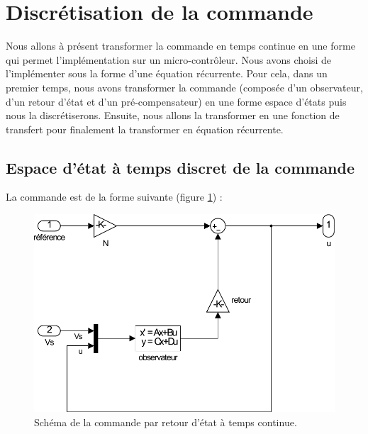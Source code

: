 	  	
	  	

\section{Discrétisation de la commande}
Nous allons à présent transformer la commande en temps continue en une forme qui permet l'implémentation sur un micro-contrôleur. Nous avons choisi de l'implémenter sous la forme d'une équation récurrente. Pour cela, dans un premier temps, nous avons transformer la commande (composée d'un observateur, d'un retour d'état et d'un pré-compensateur) en une forme espace d'états puis nous la discrétiserons. Ensuite, nous allons la transformer en une fonction de transfert pour finalement la transformer en équation récurrente.
	\subsection{Espace d'état à temps discret de la commande}
La commande est de la forme suivante (figure \ref{fig:comTC}) : 
\begin{figure}[!ht]
\centering
\includegraphics[width=.4\textwidth]{./V/images/Com_asserv.pdf}
\caption{\label{fig:comTC}Schéma de la commande par retour d'état à temps continue.}
\end{figure}


